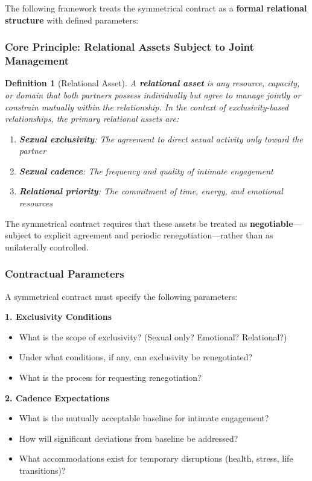 \documentclass[12pt, letterpaper]{article}
\newtheorem{definition}{Definition}[section]
\begin{document}
The following framework treats the symmetrical contract as a \textbf{formal relational structure} with defined parameters:

\subsubsection{Core Principle: Relational Assets Subject to Joint Management}

\begin{definition}[Relational Asset]
A \textbf{relational asset} is any resource, capacity, or domain that both partners possess individually but agree to manage jointly or constrain mutually within the relationship. In the context of exclusivity-based relationships, the primary relational assets are:
\begin{enumerate}
    \item \textbf{Sexual exclusivity}: The agreement to direct sexual activity only toward the partner
    \item \textbf{Sexual cadence}: The frequency and quality of intimate engagement
    \item \textbf{Relational priority}: The commitment of time, energy, and emotional resources
\end{enumerate}
\end{definition}

The symmetrical contract requires that these assets be treated as \textbf{negotiable}---subject to explicit agreement and periodic renegotiation---rather than as unilaterally controlled.

\subsubsection{Contractual Parameters}

A symmetrical contract must specify the following parameters:

\textbf{1. Exclusivity Conditions}
\begin{itemize}
    \item What is the scope of exclusivity? (Sexual only? Emotional? Relational?)
    \item Under what conditions, if any, can exclusivity be renegotiated?
    \item What is the process for requesting renegotiation?
\end{itemize}

\textbf{2. Cadence Expectations}
\begin{itemize}
    \item What is the mutually acceptable baseline for intimate engagement?
    \item How will significant deviations from baseline be addressed?
    \item What accommodations exist for temporary disruptions (health, stress, life transitions)?
\end{itemize}
\end{document}

